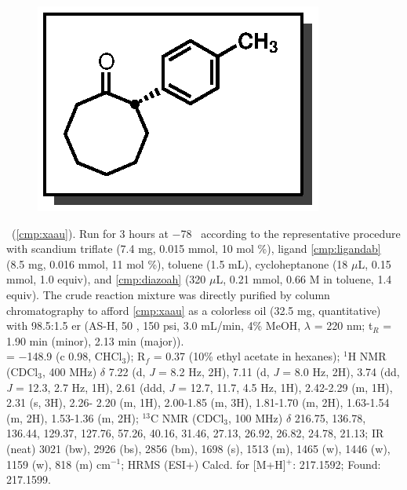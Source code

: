 \pagebreak
\begin{figure}
  \vspace{-12pt}
  \begin{center}
    \includegraphics[scale=0.8]{chp_asymmetric/images/xaau}
  \end{center}
  \vspace{-25pt}
\end{figure}\noindent \textbf{\CMPxaau}\ (\ref{cmp:xaau}). Run for 3 hours
at $-$78 \degc\  according to the representative procedure with scandium
triflate (7.4 mg, 0.015 mmol, 10 mol \%), ligand \ref{cmp:ligandab} (8.5 mg,
0.016 mmol, 11 mol \%), toluene (1.5 mL), cycloheptanone (18 $\mu$L, 0.15 mmol,
1.0 equiv), and \ref{cmp:diazoah} (320 $\mu$L, 0.21 mmol, 0.66 M in toluene, 1.4
equiv). The crude reaction mixture was directly purified by column
chromatography to afford \ref{cmp:xaau} as a colorless oil (32.5 mg,
quantitative) with 98.5:1.5 er (AS-H, 50 \degc, 150 psi, 3.0 mL/min, 4\% MeOH,
$\lambda$ = 220 nm; t$_R$ = 1.90 min (minor), 2.13 min (major)).\\
\rotation = $-$148.9 (c 0.98, CHCl$_3$); R$_f$ = 0.37 (10\% ethyl acetate in
hexanes); $^1$H NMR (CDCl$_3$, 400 MHz) $\delta$ 7.22 (d, \textit{J} = 8.2 Hz,
2H), 7.11 (d, \textit{J} = 8.0 Hz, 2H), 3.74 (dd, \textit{J} = 12.3, 2.7 Hz,
1H), 2.61 (ddd, \textit{J} = 12.7, 11.7, 4.5 Hz, 1H), 2.42-2.29 (m, 1H), 2.31
(s, 3H), 2.26- 2.20 (m, 1H), 2.00-1.85 (m, 3H), 1.81-1.70 (m, 2H), 1.63-1.54 (m,
2H), 1.53-1.36 (m, 2H); $^{13}$C NMR (CDCl$_3$, 100	MHz) $\delta$ 216.75,
136.78, 136.44, 129.37,	127.76, 57.26, 40.16, 31.46, 27.13, 26.92, 26.82, 24.78,
21.13; IR (neat) 3021 (bw), 2926 (bs), 2856 (bm), 1698 (s), 1513 (m), 1465 (w),
1446 (w), 1159 (w), 818 (m) cm$^{-1}$; HRMS (ESI+) Calcd. for 
[M+H]$^+$: 217.1592; Found: 217.1599.  \\
